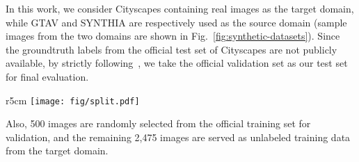 \documentclass[10pt,twocolumn,letterpaper]{article}
\begin{document}
In this work, we consider Cityscapes containing real images as the target domain, while GTAV and SYNTHIA are respectively used as the source domain (sample images from the two domains are shown in Fig.~\ref{fig:synthetic-datasets}). Since the groundtruth labels from the official test set of Cityscapes are not publicly available, by strictly following~\cite{curriculum_tpami}, we take the official validation set as our test set for final evaluation.
\begin{wrapfigure}{r}{5cm}
\vspace{-10pt}
\texttt{[image: fig/split.pdf]}
\vspace{-20pt}
\end{wrapfigure}
Also, 500 images are randomly selected from the official training set for validation, and the remaining 2,475 images are served as unlabeled training data from the target domain.
\end{document}
